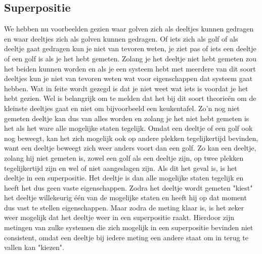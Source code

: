 \documentclass[11pt,fleqn]{book} %
\begin{document}
\subsection{Superpositie}
We hebben nu voorbeelden gezien waar golven zich als deeltjes kunnen gedragen en waar deeltjes zich als golven kunnen gedragen. Of iets zich als golf of als deeltje gaat gedragen kun je niet van tevoren weten, je ziet pas of iets een deeltje of een golf is als je het hebt gemeten. Zolang je het deeltje niet hebt gemeten zou het beiden kunnen worden en als je een systeem hebt met meerdere van dit soort deeltjes kun je niet van tevoren weten wat voor eigenschappen dat systeem gaat hebben. Wat in feite wordt gezegd is dat je niet weet wat iets is voordat je het hebt gezien. Wel is belangrijk om te melden dat het bij dit soort theorieën om de kleinste deeltjes gaat en niet om bijvoorbeeld een keukentafel. 
Zo'n nog niet gemeten deeltje kan dus van alles worden en zolang je het niet hebt gemeten is het als het ware alle mogelijke staten tegelijk. Omdat een deeltje of een golf ook nog beweegt, kan het zich mogelijk ook op andere plekken tegelijkertijd bevinden, want een deeltje beweegt zich weer anders voort dan een golf. Zo kan een deeltje, zolang hij niet gemeten is, zowel een golf als een deeltje zijn, op twee plekken tegelijkertijd zijn en wel of niet aangeslagen zijn. Als dit het geval is, is het deeltje in een superpositie. Het deeltje is dan alle mogelijke staten tegelijk en heeft het dus geen vaste eigenschappen.
Zodra het deeltje wordt gemeten "kiest" het deeltje willekeurig één van de mogelijke staten en heeft hij op dat moment dus vast te stellen eigenschappen. Maar zodra de meting klaar is, is het zeker weer mogelijk dat het deeltje weer in een superpositie raakt. Hierdoor zijn metingen van zulke systemen die zich mogelijk in een superpositie bevinden niet consistent, omdat een deeltje bij iedere meting een andere staat om in terug te vallen kan "kiezen".
\end{document}
